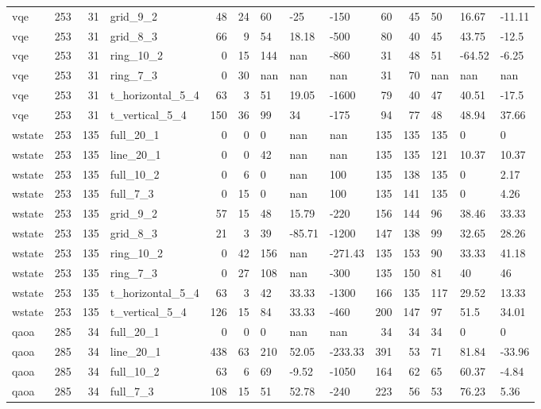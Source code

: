 \begin{longtable}{lrrlrrlllrrlll}
vqe & 253 & 31 & grid\_9\_2 & 48 & 24 & 60 & -25 & -150 & 60 & 45 & 50 & 16.67 & -11.11 \\
vqe & 253 & 31 & grid\_8\_3 & 66 & 9 & 54 & 18.18 & -500 & 80 & 40 & 45 & 43.75 & -12.5 \\
vqe & 253 & 31 & ring\_10\_2 & 0 & 15 & 144 & nan & -860 & 31 & 48 & 51 & -64.52 & -6.25 \\
vqe & 253 & 31 & ring\_7\_3 & 0 & 30 & nan & nan & nan & 31 & 70 & nan & nan & nan \\
vqe & 253 & 31 & t\_horizontal\_5\_4 & 63 & 3 & 51 & 19.05 & -1600 & 79 & 40 & 47 & 40.51 & -17.5 \\
vqe & 253 & 31 & t\_vertical\_5\_4 & 150 & 36 & 99 & 34 & -175 & 94 & 77 & 48 & 48.94 & 37.66 \\
wstate & 253 & 135 & full\_20\_1 & 0 & 0 & 0 & nan & nan & 135 & 135 & 135 & 0 & 0 \\
wstate & 253 & 135 & line\_20\_1 & 0 & 0 & 42 & nan & nan & 135 & 135 & 121 & 10.37 & 10.37 \\
wstate & 253 & 135 & full\_10\_2 & 0 & 6 & 0 & nan & 100 & 135 & 138 & 135 & 0 & 2.17 \\
wstate & 253 & 135 & full\_7\_3 & 0 & 15 & 0 & nan & 100 & 135 & 141 & 135 & 0 & 4.26 \\
wstate & 253 & 135 & grid\_9\_2 & 57 & 15 & 48 & 15.79 & -220 & 156 & 144 & 96 & 38.46 & 33.33 \\
wstate & 253 & 135 & grid\_8\_3 & 21 & 3 & 39 & -85.71 & -1200 & 147 & 138 & 99 & 32.65 & 28.26 \\
wstate & 253 & 135 & ring\_10\_2 & 0 & 42 & 156 & nan & -271.43 & 135 & 153 & 90 & 33.33 & 41.18 \\
wstate & 253 & 135 & ring\_7\_3 & 0 & 27 & 108 & nan & -300 & 135 & 150 & 81 & 40 & 46 \\
wstate & 253 & 135 & t\_horizontal\_5\_4 & 63 & 3 & 42 & 33.33 & -1300 & 166 & 135 & 117 & 29.52 & 13.33 \\
wstate & 253 & 135 & t\_vertical\_5\_4 & 126 & 15 & 84 & 33.33 & -460 & 200 & 147 & 97 & 51.5 & 34.01 \\
qaoa & 285 & 34 & full\_20\_1 & 0 & 0 & 0 & nan & nan & 34 & 34 & 34 & 0 & 0 \\
qaoa & 285 & 34 & line\_20\_1 & 438 & 63 & 210 & 52.05 & -233.33 & 391 & 53 & 71 & 81.84 & -33.96 \\
qaoa & 285 & 34 & full\_10\_2 & 63 & 6 & 69 & -9.52 & -1050 & 164 & 62 & 65 & 60.37 & -4.84 \\
qaoa & 285 & 34 & full\_7\_3 & 108 & 15 & 51 & 52.78 & -240 & 223 & 56 & 53 & 76.23 & 5.36 \\

\end{longtable}

